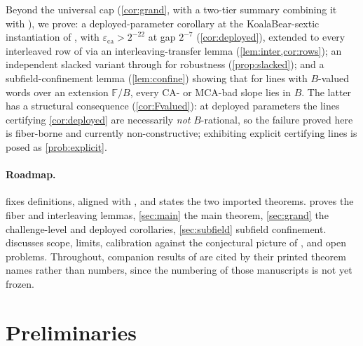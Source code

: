 \documentclass[11pt]{article}
\theoremstyle{definition}
\theoremstyle{remark}
\newcommand{\F}{\mathbb{F}}
\newcommand{\B}{B}
\newcommand{\eca}{\varepsilon_{\mathrm{ca}}}
\begin{document}
Beyond the universal cap (\cref{cor:grand}, with a two-tier summary combining it with \cite{Cho26b}), we prove: a deployed-parameter corollary at the KoalaBear-sextic instantiation of \cite[\S6.3]{ABF26}, with $\eca>2^{-22}$ at gap $2^{-7}$ (\cref{cor:deployed}), extended to every interleaved row of \cite[Tables~2--3]{ABF26} via an interleaving-transfer lemma (\cref{lem:inter,cor:rows}); an independent slacked variant through \cite[Thm.~1.9]{BCHKS25} for robustness (\cref{prop:slacked}); and a subfield-confinement lemma (\cref{lem:confine}) showing that for lines with $\B$-valued words over an extension $\F/\B$, every CA- or MCA-bad slope lies in $\B$. The latter has a structural consequence (\cref{cor:Fvalued}): at deployed parameters the lines certifying \cref{cor:deployed} are necessarily \emph{not} $\B$-rational, so the failure proved here is fiber-borne and currently non-constructive; exhibiting explicit certifying lines is posed as \cref{prob:explicit}.

\paragraph{Roadmap.}  fixes definitions, aligned with \cite[Defs.~4.1, 4.3]{ABF26}, and states the two imported theorems.  proves the fiber and interleaving lemmas, \cref{sec:main} the main theorem, \cref{sec:grand} the challenge-level and deployed corollaries, \cref{sec:subfield} subfield confinement.  discusses scope, limits, calibration against the conjectural picture of \cite{Cho26b}, and open problems. Throughout, companion results of \cite{Cho26a,Cho26b} are cited by their printed theorem names rather than numbers, since the numbering of those manuscripts is not yet frozen.

\section{Preliminaries}\label{sec:prelim}
\end{document}
